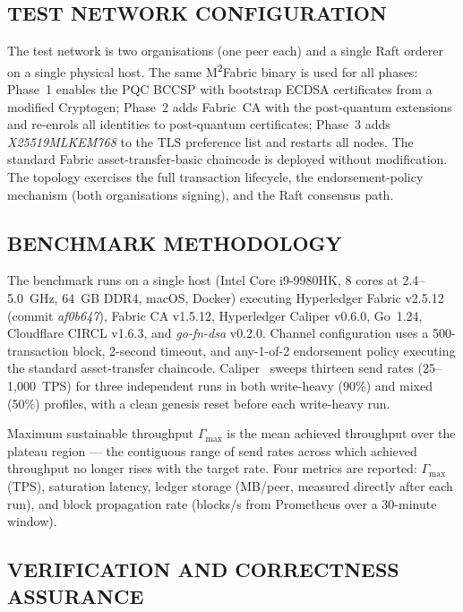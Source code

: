 \documentclass{ieeetj}
\newcommand{\mfabric}{M\textsuperscript{2}Fabric}
\begin{document}
\subsection{TEST NETWORK CONFIGURATION}
\label{sec:exp_testnet}

The test network is two organisations (one peer each) and a single Raft
orderer on a single physical host. The same \mfabric{} binary is used
for all phases: Phase~1 enables the PQC BCCSP with bootstrap ECDSA
certificates from a modified Cryptogen; Phase~2 adds Fabric~CA with the
post-quantum extensions and re-enrols all identities to post-quantum
certificates; Phase~3 adds \textit{X25519MLKEM768} to the TLS preference
list and restarts all nodes. The standard Fabric asset-transfer-basic
chaincode is deployed without modification. The topology exercises the
full transaction lifecycle, the endorsement-policy mechanism (both
organisations signing), and the Raft consensus path.

\subsection{BENCHMARK METHODOLOGY}
\label{sec:exp_benchmethod}

The benchmark runs on a single host (Intel Core i9-9980HK, 8 cores at
2.4--5.0~GHz, 64~GB DDR4, macOS, Docker) executing Hyperledger Fabric
v2.5.12 (commit \textit{af0b647}), Fabric CA v1.5.12, Hyperledger
Caliper v0.6.0, Go~1.24, Cloudflare CIRCL v1.6.3, and \textit{go-fn-dsa}
v0.2.0. Channel configuration uses a 500-transaction block, 2-second
timeout, and any-1-of-2 endorsement policy executing the standard
asset-transfer chaincode. Caliper~\cite{caliper2023} sweeps thirteen
send rates (25--1{,}000~TPS) for three independent runs in both
write-heavy (90\%) and mixed (50\%) profiles, with a clean genesis
reset before each write-heavy run.

Maximum sustainable throughput $\Gamma_{\max}$ is the mean achieved
throughput over the plateau region --- the contiguous range of send
rates across which achieved throughput no longer rises with the target
rate. Four metrics are reported: $\Gamma_{\max}$ (TPS), saturation
latency, ledger storage (MB/peer, measured directly after each run), and
block propagation rate (blocks/s from Prometheus over a 30-minute
window).

\subsection{VERIFICATION AND CORRECTNESS ASSURANCE}
\label{sec:exp_verify}
\end{document}
